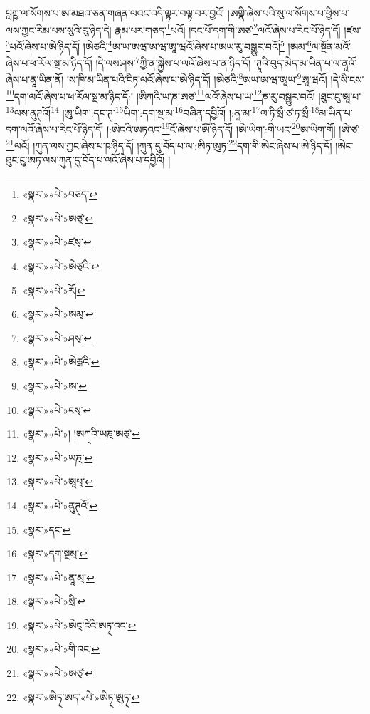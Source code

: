 པླཀྵ་ལ་སོགས་པ་ཨ་མཐའ་ཅན་གཞན་ལའང་འདི་ལྟར་བལྟ་བར་བྱའོ། །ཨགྣི་ཞེས་པའི་སུ་ལ་སོགས་པ་ཕྱིས་པ་ལས་ཀྱང་རིམ་པས་སུའི་རུ་ཉིད་དེ། རྣམ་པར་གཅད་\footnote{«སྣར་»«པེ་»བཅད་}པའོ། །དང་པོ་དག་གི་ཨཙ་\footnote{«སྣར་»«པེ་»ཨཙ྄་}ལའོ་ཞེས་པ་རིང་པོ་ཉིད་དོ། །ཛས་\footnote{«སྣར་»«པེ་»ཛས྄་}པའོ་ཞེས་པ་ཨེ་ཉིད་དོ། །ཨེཙའི་\footnote{«སྣར་»«པེ་»ཨེཙ྄འི་}ཨ་ཡ་ཨཝ་ཨ་ཝ་ཨཱ་ཝའོ་ཞེས་པ་ཨཡ་རུ་བསྒྱུར་བའོ།\footnote{«སྣར་»«པེ་»རོ།} །ཨམ་\footnote{«སྣར་»«པེ་»ཨམ྄་}ལ་སྔོན་མའོ་ཞེས་པ་ཕ་རོལ་སྔ་མ་ཉིད་དོ། །དེ་ལས་ཤས་\footnote{«སྣར་»«པེ་»ཤས྄་}ཀྱི་ན་སྐྱེས་པ་ལའོ་ཞེས་པ་ན་ཉིད་དོ། །ཊཱའི་བུད་མེད་མ་ཡིན་པ་ལ་ནཱའོ་ཞེས་པ་ནཱ་ཡིན་ནོ། །ས་ཁི་མ་ཡིན་པའི་ངིཏ་ལའོ་ཞེས་པ་ཨེ་ཉིད་དོ། །ཨེཙའི་\footnote{«སྣར་»«པེ་»ཨེཙྲའི་}ཨཡ་ཨ་ཝ་ཨཱཡ་\footnote{«སྣར་»«པེ་»ཨ་}ཨཱ་ཝའོ། །དེ་སི་ངས་\footnote{«སྣར་»«པེ་»ངས྄་}དག་ལའོ་ཞེས་པ་ཕ་རོལ་སྔ་མ་ཉིད་དོ:། །ཨིཀའི་ཡ་ཎ་ཨཙ་\footnote{«སྣར་»«པེ་»། །ཨཀ྄འི་ཡཎ྄་ཨཙ྄་}ལའོ་ཞེས་པ་ཡ་\footnote{«སྣར་»«པེ་»ཡཎ྄་}ཎ་རུ་བསྒྱུར་བའོ། །ཐུང་ངུ་ཨཱ་པ་\footnote{«སྣར་»«པེ་»ཨཱཔ྄་}ལས་ནུཊའོ།\footnote{«སྣར་»«པེ་»ནུཊ྄འོ།} །ཨུ་ཡིག་:དང་ཊ་\footnote{«སྣར་»དང་}ཡིག་:དག་སྔ་མ་\footnote{«སྣར་»དག་སྔམ྄་}བཞིན་དབྱིའོ། །:ནཱ་མ་\footnote{«སྣར་»«པེ་»ནཱ་མ྄་}ལ་ཏི་སྲྀ་ཙ་ཏ་སྲྀ་\footnote{«སྣར་»«པེ་»སྲི་}མ་ཡིན་པ་དག་ལའོ་ཞེས་པ་རིང་པོ་ཉིད་དོ། །:ཨེངའི་ཨཏའང་\footnote{«སྣར་»«པེ་»ཨེང྄་ངེའི་ཨཏ྄་འང་}ངོ་ཞེས་པ་ཨཽ་ཉིད་དོ། །ཨེ་ཡིག་:གི་ཡང་\footnote{«སྣར་»«པེ་»གི་འང་}ཨ་ཡིག་གོ། །ཨེ་ཙ་\footnote{«སྣར་»«པེ་»ཨཙ྄་}ལའོ། །ཀུན་ལས་ཀྱང་ཞེས་པ་ཥ་ཉིད་དོ། །ཀུན་དུ་བོད་པ་ལ་:ཨིཏ་ཨུཏ་\footnote{«སྣར་»ཨིཏ྄་ཨད་«པེ་»ཨིཏ྄་ཨུཏ྄་}དག་གི་ཨེང་ཞེས་པ་ཨེ་ཉིད་དོ། །ཨེང་ཐུང་ངུ་ཨཏ་ལས་ཀུན་དུ་བོད་པ་ལའོ་ཞེས་པ་དབྱིའོ། །
